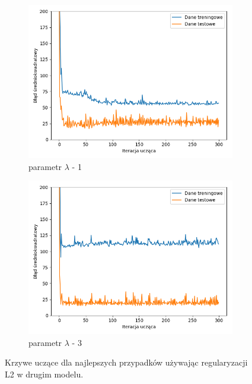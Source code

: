 \documentclass[12pt]{aghdpl}
\begin{document}
\begin{figure}[h]
		 	\begin{subfigure}{.5\linewidth}
		 		\includegraphics[width =\linewidth]{wykresy/6_regularyzacja/l2/regularyzacja_1_wykres_uczenia.png}
		 		\caption{parametr $\lambda$ - 1}
		 	\end{subfigure}
		 	\begin{subfigure}{.5\linewidth}
		 		\includegraphics[width =\linewidth]{wykresy/6_regularyzacja/l2/regularyzacja_3_wykres_uczenia.png}
		 		\caption{parametr $\lambda$ - 3}
		 	\end{subfigure}
	 	
 			\caption{Krzywe uczące dla najlepszych przypadków używając regularyzacji L2 w drugim modelu.}
			\label{fig: drugi_model_przy_regularyzacji_l2_wykresy_uczenia}
		\end{figure}
		
\end{document}
